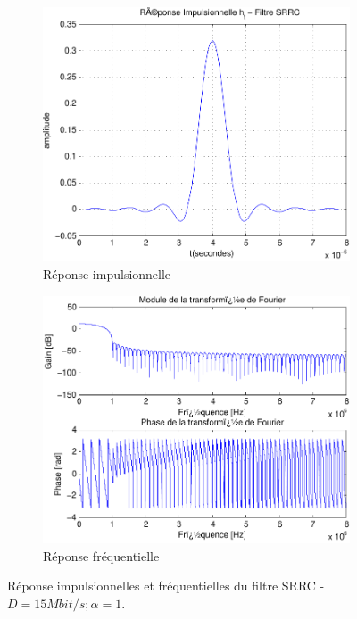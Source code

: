 \documentclass[a4paper,11pt]{article}
\begin{document}
\begin{figure}[htb]
	\begin{subfigure}{.5\textwidth}
  		\centering
  		\includegraphics[width=1\linewidth]{impul_srrc_alpha_1-crop.pdf}
  		\caption{Réponse impulsionnelle}
  		\label{fig:srrc_impul15M_alp1}
	\end{subfigure}
	\begin{subfigure}{.5\textwidth}
  		\centering
  		\includegraphics[width=1\linewidth]{frec_srrc_alpha_1-crop.pdf}
  		\caption{Réponse fréquentielle}
  		\label{fig:srrc_frec15M_alp1}
	\end{subfigure}%
	\caption{Réponse impulsionnelles et fréquentielles du filtre SRRC - $D=15 Mbit/s ; \alpha =1$.}
	\label{fig:srrc15M_alp1}
\end{figure}
  
\end{document}
